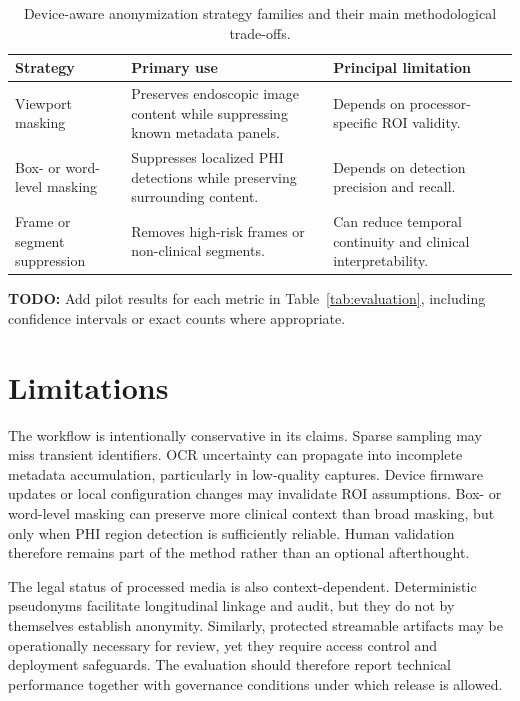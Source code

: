 \documentclass{article}
\begin{document}
\begin{table}[htbp]
\centering
\begin{tabular}{p{}p{}p{}}
\toprule
\textbf{Strategy} & \textbf{Primary use} & \textbf{Principal limitation} \\
\midrule
Viewport masking & Preserves endoscopic image content while suppressing known
metadata panels. & Depends on processor-specific ROI validity. \\
Box- or word-level masking & Suppresses localized PHI detections while
preserving surrounding content. & Depends on detection precision and recall. \\
Frame or segment suppression & Removes high-risk frames or non-clinical
segments. & Can reduce temporal continuity and clinical interpretability. \\
\bottomrule
\end{tabular}
\caption{Device-aware anonymization strategy families and their main
methodological trade-offs.}
\label{tab:strategies}
\end{table}

\noindent\textbf{TODO:} Add pilot results for each metric in
Table~\ref{tab:evaluation}, including confidence intervals or exact counts
where appropriate.

\section{Limitations}
The workflow is intentionally conservative in its claims. Sparse sampling may
miss transient identifiers. OCR uncertainty can propagate into incomplete
metadata accumulation, particularly in low-quality captures. Device firmware
updates or local configuration changes may invalidate ROI assumptions. Box- or
word-level masking can preserve more clinical context than broad masking, but
only when PHI region detection is sufficiently reliable. Human validation
therefore remains part of the method rather than an optional afterthought.

The legal status of processed media is also context-dependent. Deterministic
pseudonyms facilitate longitudinal linkage and audit, but they do not by
themselves establish anonymity. Similarly, protected streamable artifacts may be
operationally necessary for review, yet they require access control and
deployment safeguards. The evaluation should therefore report technical
performance together with governance conditions under which release is allowed.
\end{document}
